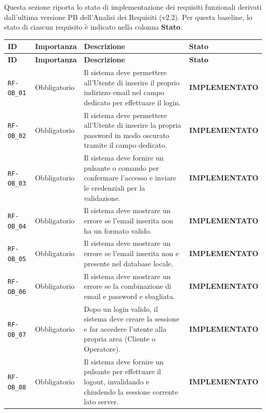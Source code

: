 \documentclass[a4paper, 11pt, oneside]{scrartcl}
\begin{document}
Questa sezione riporta lo stato di implementazione dei requisiti funzionali derivati dall'ultima versione PB dell'Analisi dei Requisiti (v2.2). Per questa baseline, lo stato di ciascun requisito è indicato nella colonna \textbf{Stato}.

\renewcommand{\arraystretch}{1.15}
\begin{longtable}{|>{\raggedright\arraybackslash}p{}|>{\raggedright\arraybackslash}p{}|>{\raggedright\arraybackslash}p{}|>{\raggedright\arraybackslash}p{}|}
    \hline
    \rowcolor[gray]{0.9}
    \textbf{ID} & \textbf{Importanza} & \textbf{Descrizione} & \textbf{Stato} \\
    \hline
    \endfirsthead
    \hline
    \rowcolor[gray]{0.9}
    \textbf{ID} & \textbf{Importanza} & \textbf{Descrizione} & \textbf{Stato} \\
    \hline
    \endhead
    \texttt{RF-OB\_01} & Obbligatorio & Il sistema deve permettere all'Utente di inserire il proprio indirizzo email nel campo dedicato per effettuare il login. & \textbf{IMPLEMENTATO} \\
    \hline
    \texttt{RF-OB\_02} & Obbligatorio & Il sistema deve permettere all'Utente di inserire la propria password in modo oscurato tramite il campo dedicato. & \textbf{IMPLEMENTATO} \\
    \hline
    \texttt{RF-OB\_03} & Obbligatorio & Il sistema deve fornire un pulsante o comando per confermare l'accesso e inviare le credenziali per la validazione. & \textbf{IMPLEMENTATO} \\
    \hline
    \texttt{RF-OB\_04} & Obbligatorio & Il sistema deve mostrare un errore se l'email inserita non ha un formato valido. & \textbf{IMPLEMENTATO} \\
    \hline
    \texttt{RF-OB\_05} & Obbligatorio & Il sistema deve mostrare un errore se l'email inserita non e presente nel database locale. & \textbf{IMPLEMENTATO} \\
    \hline
    \texttt{RF-OB\_06} & Obbligatorio & Il sistema deve mostrare un errore se la combinazione di email e password e sbagliata. & \textbf{IMPLEMENTATO} \\
    \hline
    \texttt{RF-OB\_07} & Obbligatorio & Dopo un login valido, il sistema deve creare la sessione e far accedere l'utente alla propria area (Cliente o Operatore). & \textbf{IMPLEMENTATO} \\
    \hline
    \texttt{RF-OB\_08} & Obbligatorio & Il sistema deve fornire un pulsante per effettuare il logout, invalidando e chiudendo la sessione corrente lato server. & \textbf{IMPLEMENTATO} \\

\end{longtable}
\end{document}
